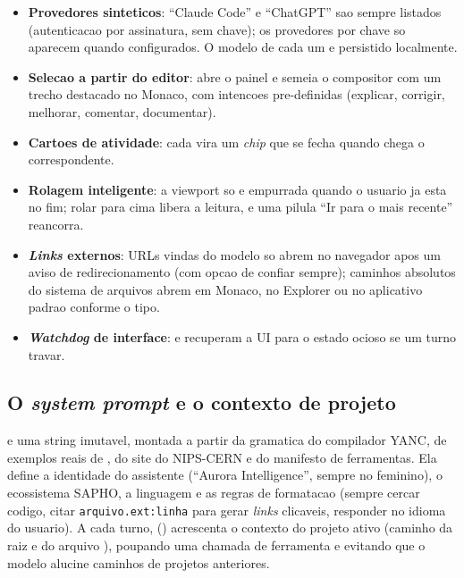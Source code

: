 \begin{itemize}[leftmargin=1.4em]
  \item \textbf{Provedores sinteticos}: \enquote{Claude Code} e \enquote{ChatGPT} sao sempre listados (autenticacao por assinatura, sem chave); os provedores por chave so aparecem quando configurados. O modelo de cada um e persistido localmente.
  \item \textbf{Selecao a partir do editor}:  abre o painel e semeia o compositor com um trecho destacado no Monaco, com intencoes pre-definidas (explicar, corrigir, melhorar, comentar, documentar).
  \item \textbf{Cartoes de atividade}: cada  vira um \emph{chip} que se fecha quando chega o  correspondente.
  \item \textbf{Rolagem inteligente}: a viewport so e empurrada quando o usuario ja esta no fim; rolar para cima libera a leitura, e uma pilula \enquote{Ir para o mais recente} reancorra.
  \item \textbf{\emph{Links} externos}: URLs vindas do modelo so abrem no navegador apos um aviso de redirecionamento (com opcao de confiar sempre); caminhos absolutos do sistema de arquivos abrem em Monaco, no Explorer ou no aplicativo padrao conforme o tipo.
  \item \textbf{\emph{Watchdog} de interface}:  e  recuperam a UI para o estado ocioso se um turno travar.
\end{itemize}

\subsection{O \emph{system prompt} e o contexto de projeto}

 e uma string imutavel, montada a partir da
gramatica do compilador YANC, de exemplos reais de \cmm{}, do site do NIPS-CERN e
do manifesto de ferramentas. Ela define a identidade do assistente
(\enquote{Aurora Intelligence}, sempre no feminino), o ecossistema SAPHO, a
linguagem \cmm{} e as regras de formatacao (sempre cercar codigo, citar
\lstinline|arquivo.ext:linha| para gerar \emph{links} clicaveis, responder no
idioma do usuario). A cada turno, 
() acrescenta o contexto do projeto ativo (caminho da
raiz e do arquivo ), poupando uma chamada de ferramenta e evitando que
o modelo alucine caminhos de projetos anteriores.

